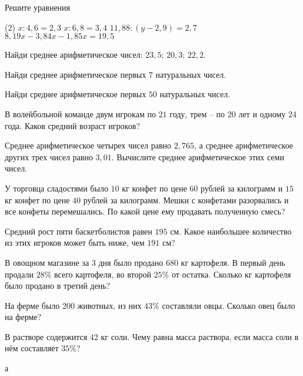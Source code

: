 \begin{class}[number=2]
	\begin{listofex}
		\item Решите уравнения \begin{tasks}(2)
			\task \( x : 4,6 = 2,3 \)
			\task \( x : 6,8 = 3,4 \)
			\task \( 11,88 : (y - 2,9) = 2,7 \)
			\task \( 8,19x - 3,84x - 1,85x = 19,5\)
		\end{tasks}
		\item Найди среднее арифметическое чисел: \( 23,5 \); \( 20,3 \); \( 22,2 \).
		\item Найди среднее арифметическое первых \( 7 \) натуральных чисел.
		\item Найди среднее арифметическое первых \( 50 \) натуральных чисел.
		\item В волейбольной команде двум игрокам по \( 21 \) году, трем – по \( 20 \) лет и одному \( 24 \) года. Каков средний возраст игроков?
		\item Среднее арифметическое четырех чисел равно \( 2,765 \), а среднее арифметическое других трех чисел равно \( 3,01 \). Вычислите среднее арифметическое этих семи чисел.
		\item У торговца сладостями было \( 10 \) кг конфет по цене \( 60 \) рублей за килограмм и \( 15  \) кг конфет по цене \( 40 \) рублей за килограмм. Мешки с конфетами разорвались и все конфеты перемешались. По какой цене ему продавать полученную смесь?
		\item Средний рост пяти баскетболистов равен \( 195 \) см. Какое наибольшее количество из этих игроков может быть ниже, чем \( 191 \) см?
		\item В овощном магазине за \( 3 \) дня было продано \( 680 \) кг картофеля. В первый день продали \( 28\%  \) всего картофеля, во второй \( 25\% \) от остатка. Сколько кг картофеля было продано в третий день?
		\item На ферме было \( 200 \) животных, из них \( 43\% \) составляли овцы. Сколько овец было на ферме? 
		\item В растворе содержится \( 42 \) кг соли. Чему равна масса раствора, если масса соли в нём составляет \( 35\% \)?
	\end{listofex}
\end{class}

\begin{homework}[number=1]
	\begin{listofex}
		\item а
	\end{listofex}
\end{homework}

